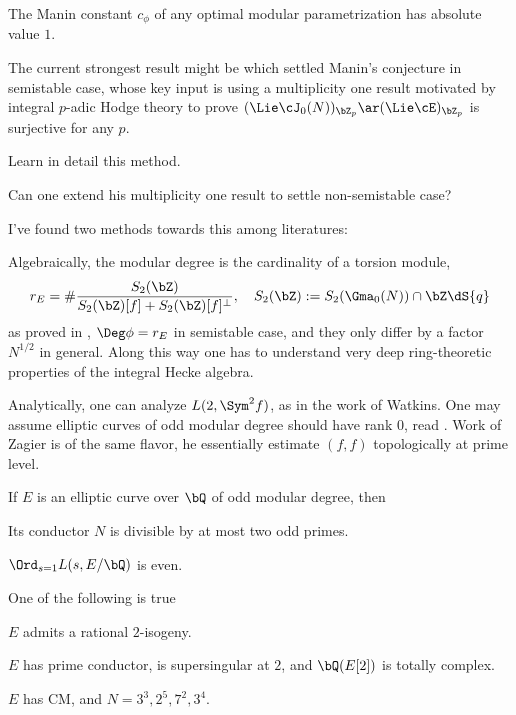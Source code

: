 \documentclass[article, a4paper, twoside]{universal}
\begin{document}
\begin{cnj}
	The Manin constant $c_{\phi}$ of any optimal modular parametrization has absolute value $1$.
\end{cnj}
\begin{rmk}
	The current strongest result might be \cite[Theorem~2.13]{Cesnavicius2018} which settled Manin's conjecture in semistable case, whose key input is using a multiplicity one result \cite[Proposition~2.2]{Cesnavicius2018} motivated by integral $p$-adic Hodge theory to prove $(\Lie\cJ_{0}(N))_{\bZ_{p}}\ar(\Lie\cE)_{\bZ_{p}}$ is surjective for any $p$.
	\begin{itm}
		\item[\TODO] Learn in detail this method.
		\item[\TODO] Can one extend his multiplicity one result to settle non-semistable case?
	\end{itm}
\end{rmk}


I've found two methods towards this among literatures:
\begin{itm}
	\item Algebraically, the modular degree is the cardinality of a torsion module,
	\[
		r_{E}=\#\frac{S_{2}(\bZ)}{S_{2}(\bZ)[f]+S_{2}(\bZ)[f]^{\perp}},\quad S_{2}(\bZ):=S_{2}(\Gma_{0}(N))\cap \bZ\dS{q}
	\]
	as proved in \cite{ARS2012}, $\Deg\phi=r_{E}$ in semistable case, and they only differ by a factor $N^{1/2}$ in general. Along this way one has to understand very deep ring-theoretic properties of the integral Hecke algebra.
	\item Analytically, one can analyze $L(2,\Sym^{2}f)$, as in the work of Watkins\cite{Watkins2002}. One may assume elliptic curves of odd modular degree should have rank $0$, read \cite{CE2009Odd}. Work of Zagier\cite{Zagier1985Parametrization} is of the same flavor, he essentially estimate $(f,f)$ topologically at prime level.
\end{itm}


\begin{thm}
	If $E$ is an elliptic curve over $\bQ$ of odd modular degree, then
	\begin{enr}
		\item Its conductor $N$ is divisible by at most two odd primes.
		\item $\Ord_{s=1}L(s,E/\bQ)$ is even.
		\item One of the following is true
		\begin{enr}
			\item $E$ admits a rational $2$-isogeny.
			\item $E$ has prime conductor, is supersingular at $2$, and $\bQ(E[2])$ is totally complex.
			\item $E$ has CM, and $N=3^{3},2^{5},7^{2},3^{4}$.
		\end{enr}
	\end{enr}
\end{thm}

\printref
\end{document}
